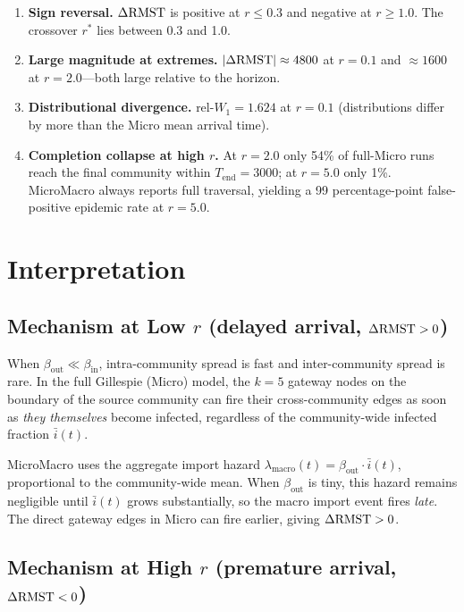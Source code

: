 \documentclass[11pt,a4paper]{article}
\begin{document}
\begin{enumerate}
  \item \textbf{Sign reversal.}  $\Delta\mathrm{RMST}$ is positive at $r \le 0.3$ and
        negative at $r \ge 1.0$.  The crossover $r^*$ lies between 0.3 and 1.0.
  \item \textbf{Large magnitude at extremes.}  $|\Delta\mathrm{RMST}| \approx 4800$ at $r=0.1$
        and $\approx 1600$ at $r=2.0$---both large relative to the horizon.
  \item \textbf{Distributional divergence.}  $\text{rel-}W_1 = 1.624$ at $r=0.1$
        (distributions differ by more than the Micro mean arrival time).
  \item \textbf{Completion collapse at high $r$.}  At $r=2.0$ only 54\% of
        full-Micro runs reach the final community within $T_{\text{end}}=3000$;
        at $r=5.0$ only 1\%.  MicroMacro always reports full traversal,
        yielding a 99 percentage-point false-positive epidemic rate at $r=5.0$.
\end{enumerate}

\section{Interpretation}

\subsection{Mechanism at Low $r$ (delayed arrival, $\Delta\mathrm{RMST} > 0$)}

When $\beta_{\text{out}} \ll \beta_{\text{in}}$, intra-community spread is fast
and inter-community spread is rare.  In the full Gillespie (Micro) model,
the $k=5$ gateway nodes on the boundary of the source community can fire their
cross-community edges as soon as \emph{they themselves} become infected,
regardless of the community-wide infected fraction $\bar{i}(t)$.

MicroMacro uses the aggregate import hazard
$\lambda_{\text{macro}}(t) = \beta_{\text{out}} \cdot \bar{i}(t)$,
proportional to the community-wide mean.  When $\beta_{\text{out}}$ is
tiny, this hazard remains negligible until $\bar{i}(t)$ grows substantially,
so the macro import event fires \emph{late}.  The direct gateway edges in Micro
can fire earlier, giving $\Delta\mathrm{RMST} > 0$.

\subsection{Mechanism at High $r$ (premature arrival, $\Delta\mathrm{RMST} < 0$)}
\end{document}
